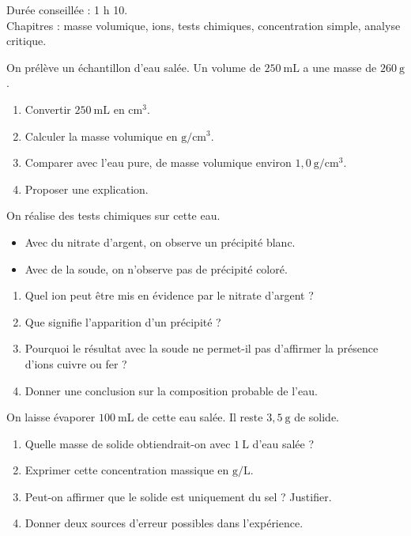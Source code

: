 \begin{objectif}
Durée conseillée : 1 h 10.\\
Chapitres : masse volumique, ions, tests chimiques, concentration simple, analyse critique.
\end{objectif}

\begin{exercice}
On prélève un échantillon d'eau salée. Un volume de $250\ \mathrm{mL}$ a une masse de $260\ \mathrm{g}$.

\begin{enumerate}
  \item Convertir $250\ \mathrm{mL}$ en $\mathrm{cm^3}$.
  \item Calculer la masse volumique en $\mathrm{g/cm^3}$.
  \item Comparer avec l'eau pure, de masse volumique environ $1{,}0\ \mathrm{g/cm^3}$.
  \item Proposer une explication.
\end{enumerate}
\end{exercice}

\begin{exercice}
On réalise des tests chimiques sur cette eau.
\begin{itemize}
  \item Avec du nitrate d'argent, on observe un précipité blanc.
  \item Avec de la soude, on n'observe pas de précipité coloré.
\end{itemize}

\begin{enumerate}
  \item Quel ion peut être mis en évidence par le nitrate d'argent ?
  \item Que signifie l'apparition d'un précipité ?
  \item Pourquoi le résultat avec la soude ne permet-il pas d'affirmer la présence d'ions cuivre ou fer ?
  \item Donner une conclusion sur la composition probable de l'eau.
\end{enumerate}
\end{exercice}

\begin{exercice}
On laisse évaporer $100\ \mathrm{mL}$ de cette eau salée. Il reste $3{,}5\ \mathrm{g}$ de solide.

\begin{enumerate}
  \item Quelle masse de solide obtiendrait-on avec $1\ \mathrm{L}$ d'eau salée ?
  \item Exprimer cette concentration massique en $\mathrm{g/L}$.
  \item Peut-on affirmer que le solide est uniquement du sel ? Justifier.
  \item Donner deux sources d'erreur possibles dans l'expérience.
\end{enumerate}
\end{exercice}

